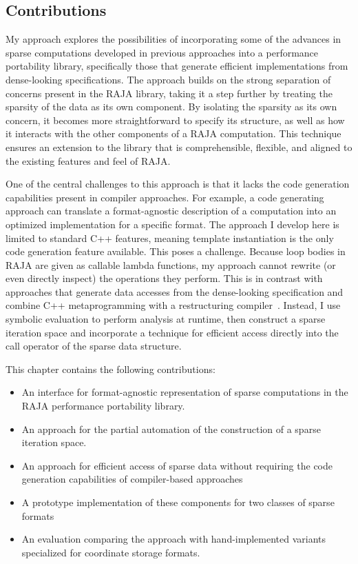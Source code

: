 \subsection{Contributions}

My approach explores the possibilities of incorporating some of the advances in sparse computations developed in previous approaches into a performance portability library, specifically those that generate efficient implementations from dense-looking specifications.
The approach builds on the strong separation of concerns present in the RAJA library, taking it a step further by treating the sparsity of the data as its own component.
By isolating the sparsity as its own concern, it becomes more straightforward to specify its structure, as well as how it interacts with the other components of a RAJA computation.
This technique ensures an extension to the library that is comprehensible, flexible, and aligned to the existing features and feel of RAJA\@.

One of the central challenges to this approach is that it lacks the code generation capabilities present in compiler approaches.
For example, a code generating approach can translate a format-agnostic description of a computation into an optimized implementation for a specific format.
The approach I develop here is limited to standard C++ features, meaning template instantiation is the only code generation feature available.
This poses a challenge.
Because loop bodies in RAJA are given as callable lambda functions, my approach cannot rewrite (or even directly inspect) the operations they perform.
This is in contrast with approaches that generate data accesses from the dense-looking specification and combine C++ metaprogramming with a restructuring compiler~\cite{ahmed2000compiling,ahmed2000framework}.
Instead, I use symbolic evaluation to perform analysis at runtime, then construct a sparse iteration space and incorporate a technique for efficient access directly into the call operator of the sparse data structure.

This chapter contains the following contributions:
\begin{itemize}
\item An interface for format-agnostic representation of sparse computations in the RAJA performance portability library.
\item An approach for the partial automation of the construction of a sparse iteration space.
\item An approach for efficient access of sparse data without requiring the code generation capabilities of compiler-based approaches
\item A prototype implementation of these components for two classes of sparse formats
\item An evaluation comparing the approach with hand-implemented variants specialized for coordinate storage formats.
\end{itemize}



